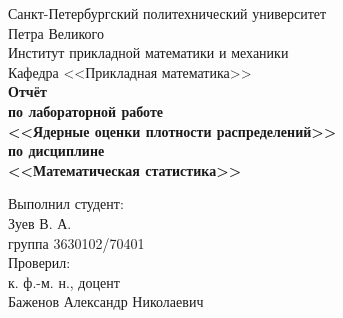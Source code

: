 \documentclass[report1.tex]{subfiles}
\begin{document}
\begin{titlepage}
\begin{center}
	\begin{large}
		Санкт-Петербургский политехнический университет\\
		Петра Великого \\ 
		\vspace{\baselineskip}
		Институт прикладной математики и механики\\
		Кафедра <<Прикладная математика>>\\
	\vfill
	\textbf{Отчёт\\
		по лабораторной работе \\
		<<Ядерные оценки плотности распределений>>\\
		по дисциплине\\
		<<Математическая статистика>>}
	\end{large}
\end{center}
\vfill
\flushleft
{\addtolength{\leftskip}{\linewidth / 2}
	Выполнил студент:\\
	Зуев В. А.\\
	группа 3630102/70401\\
	Проверил:\\
	к. ф.-м. н., доцент\\
	Баженов Александр Николаевич\\
}
\vfill
{}
\end{titlepage}
\end{document}
